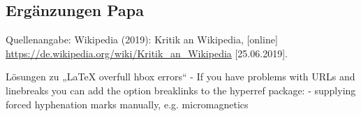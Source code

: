 \documentclass[12pt]{article}
\begin{document}
\subsection{Ergänzungen Papa}
Quellenangabe:
Wikipedia (2019): Kritik an Wikipedia, [online] \url{https://de.wikipedia.org/wiki/Kritik_an_Wikipedia} [25.06.2019].

Lösungen zu „LaTeX overfull hbox errors“
- If you have problems with URLs and linebreaks you can add the option breaklinks to the hyperref package: %
- supplying forced hyphenation marks manually, e.g. micro\-mag\-net\-ics 

\printbibliography
\end{document}
